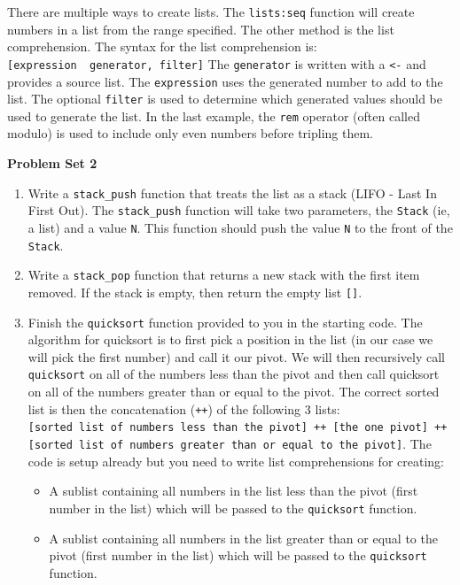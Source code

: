 \documentclass[
]{book}
\providecommand{\tightlist}{%
  \setlength{\itemsep}{0pt}\setlength{\parskip}{0pt}}
\begin{document}
There are multiple ways to create lists. The \texttt{lists:seq} function will create numbers in a list from the range specified. The other method is the list comprehension. The syntax for the list comprehension is: \texttt{{[}expression\ \textbar{}\textbar{}\ generator,\ filter{]}} The \texttt{generator} is written with a \texttt{\textless{}-} and provides a source list. The \texttt{expression} uses the generated number to add to the list. The optional \texttt{filter} is used to determine which generated values should be used to generate the list. In the last example, the \texttt{rem} operator (often called modulo) is used to include only even numbers before tripling them.

\begin{problembox}

\textbf{Problem Set 2}

\begin{enumerate}
\def\labelenumi{\arabic{enumi}.}
\tightlist
\item
  Write a \texttt{stack\_push} function that treats the list as a stack (LIFO - Last In First Out). The \texttt{stack\_push} function will take two parameters, the \texttt{Stack} (ie, a list) and a value \texttt{N}. This function should push the value \texttt{N} to the front of the \texttt{Stack}.
\item
  Write a \texttt{stack\_pop} function that returns a new stack with the first item removed. If the stack is empty, then return the empty list \texttt{{[}{]}}.
\item
  Finish the \texttt{quicksort} function provided to you in the starting code. The algorithm for quicksort is to first pick a position in the list (in our case we will pick the first number) and call it our pivot. We will then recursively call \texttt{quicksort} on all of the numbers less than the pivot and then call quicksort on all of the numbers greater than or equal to the pivot. The correct sorted list is then the concatenation (\texttt{++}) of the following 3 lists: \texttt{{[}sorted\ list\ of\ numbers\ less\ than\ the\ pivot{]}\ ++\ {[}the\ one\ pivot{]}\ ++\ {[}sorted\ list\ of\ numbers\ greater\ than\ or\ equal\ to\ the\ pivot{]}}. The code is setup already but you need to write list comprehensions for creating:

  \begin{itemize}
  \tightlist
  \item
    A sublist containing all numbers in the list less than the pivot (first number in the list) which will be passed to the \texttt{quicksort} function.
  \item
    A sublist containing all numbers in the list greater than or equal to the pivot (first number in the list) which will be passed to the \texttt{quicksort} function.
  \end{itemize}
\end{enumerate}

\end{problembox}
\end{document}
